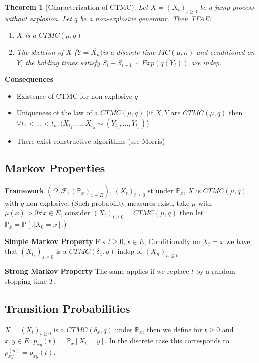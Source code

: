 \documentclass[12pt]{book}
\newtheorem{theorem}{Theorem}[section]
\theoremstyle{definition}
\theoremstyle{remark}
\begin{document}
\begin{theorem}[Characterization of CTMC]
Let $X=(X_t)_{t\geq 0}$ be a jump process without explosion. Let $q$ be a non-explosive generator. Then TFAE:
\begin{enumerate}
	\item $X$ is a $CTMC(\mu, q)$
	\item The skeleton of $X$ ($Y= \overline{X_n})$is a discrete time $MC(\mu, \kappa ) $ and conditioned on $Y$, the holding times satisfy $S_i-S_{i-1} \sim Exp(q(Y_i))$ are indep. 
\end{enumerate}

\end{theorem}
\textbf{Consequences} 
\begin{itemize}
	\item Existence of CTMC	 for non-explosive $q$ 
	\item Uniqueness of the law of a $CTMC(\mu, q)$ (if $X, Y$ are $CTMC(\mu,q )$ then $\forall t_1<...<t_n: (X_{t_1},...,X_{t_n} \sim (Y_{t_1},..., Y_{t_n})$)
	\item There exist constructive algorithms (see Morris)
\end{itemize}

\subsection{Markov Properties}
\noindent
\textbf{Framework} $(\Omega, \mathcal{F}, (\mathbb{P}_{x})_{x \in E}) $, $(X_t)_{t\geq 0}$ st under $\mathbb{P}_{x}$, $X$ is  $CTMC(\mu, q)$ with $q$ non-explosive. (Such probability measures exist, take $\mu $ with $\mu (x)> 0 \forall x \in E$, consider $(X_t)_{t\geq 0}=CTMC(\mu,q)$ then let $\mathbb{P}_{x} = \mathbb{P}_{} \left[ . | X_0 =x \right]  $.)

\textbf{Simple Markov Property} Fix $t\geq 0, x \in E$; Conditionally on $X_t =x$ we have that $(X_{t_s})_{s \geq 0}$ is a $CTMC(\delta_x, q)$ indep of $(X_n)_{n \leq t}$

\textbf{Strong Markov Property}
The same applies if we replace $t$ by a random stopping time $T$.

\subsection{Transition Probabilities}
$X=(X_t)_{t\geq 0}$ is a $CTMC(\delta_x, q)$ under $\mathbb{P}_{x} $, then we define for $t\geq 0$ and $x,y \in E$: $p_{xy}(t)= \mathbb{P}_{x} \left[ X_t =y \right] $. In the discrete case this corresponds to $p_{xy}^{(n)}= p_{xy}(t)$.
\end{document}
